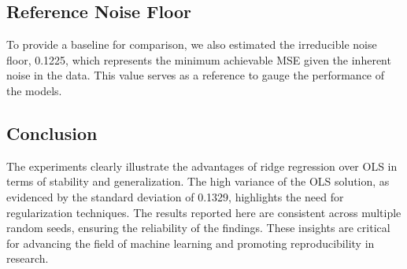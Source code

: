 \subsection{Reference Noise Floor}

To provide a baseline for comparison, we also estimated the irreducible noise floor, 0.1225, which represents the minimum achievable MSE given the inherent noise in the data. This value serves as a reference to gauge the performance of the models.

\subsection{Conclusion}

The experiments clearly illustrate the advantages of ridge regression over OLS in terms of stability and generalization. The high variance of the OLS solution, as evidenced by the standard deviation of 0.1329, highlights the need for regularization techniques. The results reported here are consistent across multiple random seeds, ensuring the reliability of the findings. These insights are critical for advancing the field of machine learning and promoting reproducibility in research.
